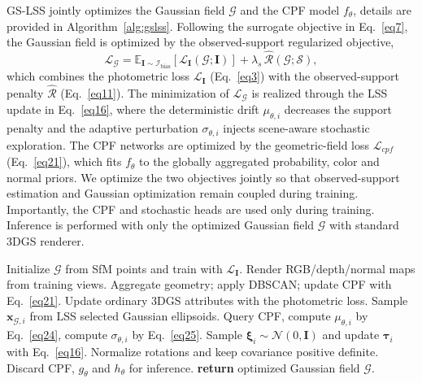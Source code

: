 \documentclass[lettersize,journal]{IEEEtran}
\begin{document}
GS-LSS jointly optimizes the Gaussian field $\mathcal{G}$ and the CPF model $f_{\theta}$, details are provided in Algorithm~\ref{alg:gslss}. Following the surrogate objective in Eq.~\ref{eq7}, the Gaussian field is optimized by the observed-support regularized objective,
\begin{equation}
    \mathcal{L}_{\mathcal{G}} = \mathbb{E}_{\mathbf{I} \sim \mathcal{I}_{\text{bias}}} \left[ \mathcal{L}_{\mathbf{I}}(\mathcal{G};\mathbf{I}) \right] + \lambda_{s} \, \widehat{\mathcal{R}}(\mathcal{G};\mathcal{S}),
    \label{eq26}
\end{equation}
which combines the photometric loss $\mathcal{L}_{\mathbf{I}}$ (Eq.~\ref{eq3}) with the observed-support penalty $\widehat{\mathcal{R}}$ (Eq.~\ref{eq11}). The minimization of $\mathcal{L}_{\mathcal{G}}$ is realized through the LSS update in Eq.~\ref{eq16}, where the deterministic drift ${\mu}_{\theta,i}$ decreases the support penalty and the adaptive perturbation ${\sigma}_{\theta,i}$ injects scene-aware stochastic exploration. The CPF networks are optimized by the geometric-field loss $\mathcal{L}_{cpf}$ (Eq.~\ref{eq21}), which fits $f_{\theta}$ to the globally aggregated probability, color and normal priors. 
We optimize the two objectives jointly so that observed-support estimation and Gaussian optimization remain coupled during training.
Importantly, the CPF and stochastic heads are used only during training. Inference is performed with only the optimized Gaussian field $\mathcal{G}$ with standard 3DGS renderer.    


\begin{algorithm}[t]
\caption{CPF-guided stochastic optimization in GS-LSS}
\label{alg:gslss}
\footnotesize
\begin{algorithmic}[1]
\STATE Initialize $\mathcal{G}$ from SfM points and train with $\mathcal{L}_{\mathbf{I}}$.
    \STATE Render RGB/depth/normal maps from training views.
        \STATE Aggregate geometry; apply DBSCAN; update CPF with Eq.~\ref{eq21}.
    \ENDIF
    \STATE Update ordinary 3DGS attributes with the photometric loss.
        \STATE Sample $\mathbf{x}_{\mathcal{G},i}$ from LSS selected Gaussian ellipsoids.
        \STATE Query CPF, compute $\mu_{\theta,i}$ by Eq.~\ref{eq24}, compute $\sigma_{\theta,i}$ by Eq.~\ref{eq25}.
        \STATE Sample $\boldsymbol{\xi}_i\sim\mathcal{N}(0,\mathbf{I})$ and update $\boldsymbol{\tau}_i$ with Eq.~\ref{eq16}.
        \STATE Normalize rotations and keep covariance positive definite.
    \ENDIF
\ENDFOR
\STATE Discard CPF, $g_{\theta}$ and $h_{\theta}$ for inference.
\STATE \textbf{return} optimized Gaussian field $\mathcal{G}$.
\end{algorithmic}
\end{algorithm}
\end{document}
